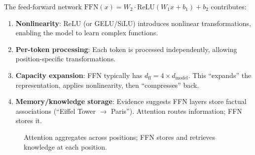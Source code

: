 \begin{remark}
    The feed-forward network $\text{FFN}(x) = W_2 \cdot \text{ReLU}(W_1 x + b_1) + b_2$ contributes:

    \begin{enumerate}
        \item \textbf{Nonlinearity}: ReLU (or GELU/SiLU) introduces nonlinear transformations, enabling the model to learn complex functions.

        \item \textbf{Per-token processing}: Each token is processed independently, allowing position-specific transformations.

        \item \textbf{Capacity expansion}: FFN typically has $d_{\text{ff}} = 4 \times d_{\text{model}}$. This ``expands'' the representation, applies nonlinearity, then ``compresses'' back.

        \item \textbf{Memory/knowledge storage}: Evidence suggests FFN layers store factual associations (``Eiffel Tower $\to$ Paris''). Attention routes information; FFN stores it.
    \end{enumerate}
\end{remark}

\begin{figure}[h]
\centering
\caption{Attention aggregates across positions; FFN stores and retrieves knowledge at each position.}
\end{figure}

